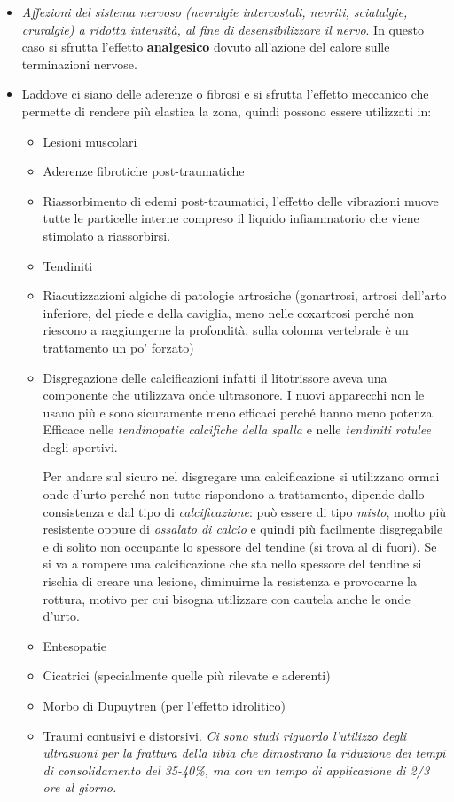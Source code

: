 \begin{itemize}
\item
  \emph{Affezioni del sistema nervoso (nevralgie intercostali, nevriti,
  sciatalgie, cruralgie) a ridotta intensità, al fine di
  desensibilizzare il nervo}. In questo caso si sfrutta l'effetto
  \textbf{analgesico} dovuto all'azione del calore sulle terminazioni
  nervose.
\item
  Laddove ci siano delle aderenze o fibrosi e si sfrutta l'effetto
  meccanico che permette di rendere più elastica la zona, quindi possono
  essere utilizzati in:

  \begin{itemize}
  \item
    Lesioni muscolari
  \item
    Aderenze fibrotiche post-traumatiche
  \item
    Riassorbimento di edemi post-traumatici, l'effetto delle vibrazioni
    muove tutte le particelle interne compreso il liquido infiammatorio
    che viene stimolato a riassorbirsi.
  \item
    Tendiniti
  \item
    Riacutizzazioni algiche di patologie artrosiche (gonartrosi, artrosi
    dell'arto inferiore, del piede e della caviglia, meno nelle
    coxartrosi perché non riescono a raggiungerne la profondità, sulla
    colonna vertebrale è un trattamento un po' forzato)
  \item
    Disgregazione delle calcificazioni infatti il litotrissore aveva una
    componente che utilizzava onde ultrasonore. I nuovi apparecchi non
    le usano più e sono sicuramente meno efficaci perché hanno meno
    potenza. Efficace nelle \emph{tendinopatie calcifiche della spalla}
    e nelle \emph{tendiniti rotulee} degli sportivi.
 
Per andare sul sicuro nel disgregare una calcificazione si utilizzano
ormai onde d'urto perché non tutte rispondono a trattamento, dipende
dallo consistenza e dal tipo di \emph{calcificazione}: può essere di
tipo \emph{misto}, molto più resistente oppure di \emph{ossalato di
calcio} e quindi più facilmente disgregabile e di solito non occupante
lo spessore del tendine (si trova al di fuori). Se si va a rompere una
calcificazione che sta nello spessore del tendine si rischia di creare
una lesione, diminuirne la resistenza e provocarne la rottura, motivo
per cui bisogna utilizzare con cautela anche le onde d'urto.

\item
  Entesopatie
\item
  Cicatrici (specialmente quelle più rilevate e aderenti)
\item
  Morbo di Dupuytren (per l'effetto idrolitico)
\item
  Traumi contusivi e distorsivi. \emph{Ci sono studi riguardo l'utilizzo
  degli ultrasuoni per la frattura della tibia che dimostrano la
  riduzione dei tempi di consolidamento del 35-40\%, ma con un tempo di
  applicazione di 2/3 ore al giorno.}
\end{itemize}
\end{itemize}

